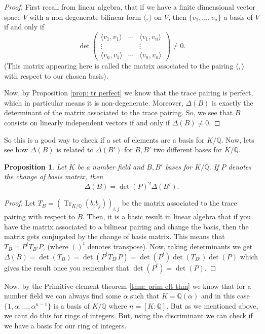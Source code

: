 \documentclass[11pt,a4paper]{report}
\theoremstyle{plain}
\newtheorem{prop}[subsection]{Proposition}
\theoremstyle{definition}
\theoremstyle{definition}
\newcommand{\Tr}{\operatorname{Tr}}
\def\QQ{\mathbb{Q}}
\def \a{\alpha}
\begin{document}
\begin{proof}
	First recall from linear algebra, that if we have a finite dimensional vector space $V$ with a non-degenerate bilinear form $\langle, \rangle$ on $V$, then $\{v_1,\dots,v_n\}$ a basis of $V$ if and only if \[\det  \left (\begin{matrix} \langle v_1, v_1 \rangle  &\cdots& \langle v_1,v_n \rangle \\ \vdots & & \vdots \\  \langle v_n,v_1\rangle &\cdots& \langle v_n,v_n\rangle
	\end{matrix} \right ) \neq 0.\] (This matrix appearing here is called the matrix associated to the pairing $\langle,\rangle$ with respect to our chosen basis).
	
	Now, by Proposition \ref{prop: tr perfect} we know that the trace pairing is perfect, which in particular means it is non-degenerate. Moreover, $\Delta(B)$ is exactly the determinant of the matrix associated to the trace pairing. So, we see that  $B$ consists on linearly independent vectors if and only if $\Delta(B) \neq 0$.
\end{proof}
So this is a good way to check if a set of elements are a basis for $K/\QQ$. Now, lets see how $\Delta(B)$ is related to $\Delta(B')$ for $B,B'$ two different bases for $K/\QQ$.

\begin{prop}\label{prop: disc change of basis}
	Let $K$ be a number field and $B,B'$ bases for $K/\QQ$. If $P$ denotes the change of basis matrix, then \[\Delta(B)=\det(P)^2 \Delta(B').\]
\end{prop}

\begin{proof}
	Let $T_B=(\Tr_{K/\QQ}(b_i b_j))_{i,j}$ be the matrix associated to the trace pairing with respect to $B$. Then, it is a basic result in linear algebra that if you have the matrix associated to a bilinear pairing and change the basis, then the matrix gets conjugated by the change of basis matrix. This means that $T_B=P^{t}T_{B'}P$, (where $()^t$ denotes transpose). Now, taking determinants we get $\Delta(B)=\det(T_B)=\det(P^t T_{B'}P)=\det(P^t)\det(T_{B'})\det(P)$ which gives the result once you remember that $\det(P^t)=\det(P)$. 
\end{proof}


Now, by the Primitive element theorem \ref{thm: prim elt thm} we know that for a number field we can always find some $\a$ such that $K=\QQ(\a)$ and in this case $\{1,\a,\dots,\a^{n-1}\}$ is a basis of $K/\QQ$ where $n=[K:\QQ]$. But as we mentioned above, we cant do this for rings of integers. But, using the discriminant we can check if we have a basis for our ring of integers.
\end{document}
